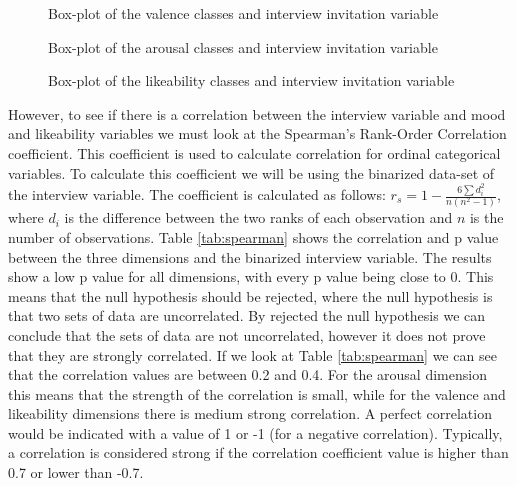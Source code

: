 \begin{figure}[h]
  \centering
  
  \caption{Box-plot of the valence classes and interview invitation variable}
  \label{fig:boxplotval}
\end{figure}

\begin{figure}[h]
  \centering
  
  \caption{Box-plot of the arousal classes and interview invitation variable}
  \label{fig:boxplotaro}
\end{figure}

\begin{figure}[h]
  \centering
  
  \caption{Box-plot of the likeability classes and interview invitation variable}
  \label{fig:boxplotlike}
\end{figure}

However, to see if there is a correlation between the interview variable and mood and likeability variables we must look at the Spearman's Rank-Order Correlation coefficient. This coefficient is used to calculate correlation for ordinal categorical variables. To calculate this coefficient we will be using the binarized data-set of the interview variable. The coefficient is calculated as follows: \(r_{s} = 1 - \frac{6\sum d_{i}^2}{n(n^2-1)}\), where \(d_i\) is the difference between the two ranks of each observation and \(n\) is the number of observations. Table \ref{tab:spearman} shows the correlation and p value between the three dimensions and the binarized interview variable. The results show a low p value for all dimensions, with every p value being close to 0. This means that the null hypothesis should be rejected, where the null hypothesis is that two sets of data are uncorrelated. By rejected the null hypothesis we can conclude that the sets of data are not uncorrelated, however it does not prove that they are strongly correlated. If we look at Table \ref{tab:spearman} we can see that the correlation values are between 0.2 and 0.4. For the arousal dimension this means that the strength of the correlation is small, while for the valence and likeability dimensions there is medium strong correlation. A perfect correlation would be indicated with a value of 1 or -1 (for a negative correlation). Typically, a correlation is considered strong if the correlation coefficient value is higher than 0.7 or lower than -0.7. 

